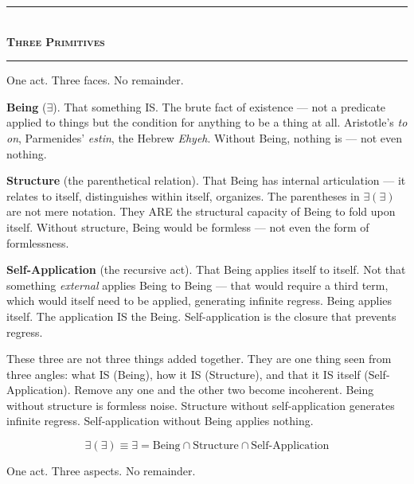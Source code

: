 \documentclass[10pt, openany, oneside]{book}
\renewcommand{\normalsize}{\fontsize{10}{13}\selectfont}
\begin{document}

\begin{center}
    \rule{0.3\textwidth}{0.4pt}\\[0.5em]
    {\normalsize\bfseries\scshape Three Primitives}\\[0.3em]
    \rule{0.3\textwidth}{0.4pt}
\end{center}

\vspace{1em}

\noindent One act. Three faces. No remainder.

\textbf{Being} ($\exists$). That something IS. The brute fact of existence --- not a predicate applied to things but the condition for anything to be a thing at all. Aristotle's \textit{to on}, Parmenides' \textit{estin}, the Hebrew \textit{Ehyeh}. Without Being, nothing is --- not even nothing.

\textbf{Structure} (the parenthetical relation). That Being has internal articulation --- it relates to itself, distinguishes within itself, organizes. The parentheses in $\exists(\exists)$ are not mere notation. They ARE the structural capacity of Being to fold upon itself. Without structure, Being would be formless --- not even the form of formlessness.

\textbf{Self-Application} (the recursive act). That Being applies itself to itself. Not that something \textit{external} applies Being to Being --- that would require a third term, which would itself need to be applied, generating infinite regress. Being applies itself. The application IS the Being. Self-application is the closure that prevents regress.

These three are not three things added together. They are one thing seen from three angles: what IS (Being), how it IS (Structure), and that it IS itself (Self-Application). Remove any one and the other two become incoherent. Being without structure is formless noise. Structure without self-application generates infinite regress. Self-application without Being applies nothing.

$$\exists(\exists) \equiv \exists = \text{Being} \cap \text{Structure} \cap \text{Self-Application}$$

One act. Three aspects. No remainder.
\end{document}
